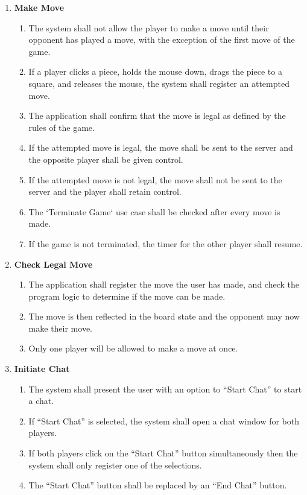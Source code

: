 \documentclass[12pt, titlepage]{article}
\begin{document}
\begin{enumerate}[{UC}1.]
        	\item \textbf{Make Move}
        	\begin{enumerate}[{FR}1., resume]
        		\item The system shall not allow the player to make a move until their opponent has played a move, with the exception of the first move of the game.
        		\item If a player clicks a piece, holds the mouse down, drags the piece to a square, and releases the mouse, the system shall register an attempted move.
        		\item The application shall confirm that the move is legal as defined by the rules of the game. 
        		\item If the attempted move is legal, the move shall be sent to the server and the opposite player shall be given control.
        		\item If the attempted move is not legal, the move shall not be sent to the server and the player shall retain control.
        		\item The `Terminate Game` use case shall be checked after every move is made.
        		\item If the game is not terminated, the timer for the other player shall resume.
        	\end{enumerate}
        	
        	\item \textbf{Check Legal Move}
        	\begin{enumerate}[{FR}1., resume]
        		\item The application shall register the move the user has made, and check the program logic to determine if the move can be made.
        		\item The move is then reflected in the board state and the opponent may now make their move.
        		\item Only one player will be allowed to make a move at once.
        	\end{enumerate}
        	
        	\item \textbf{Initiate Chat}
        	\begin{enumerate}[{FR}1., resume]
        		\item The system shall present the user with an option to ``Start Chat'' to start a chat.
        		\item If ``Start Chat'' is selected, the system shall open a chat window for both players.
        		\item If both players click on the ``Start Chat'' button simultaneously then the system shall only register one of the selections.
        		\item The ``Start Chat'' button shall be replaced by an ``End Chat'' button.
        	\end{enumerate}
        	

\end{enumerate}
\end{document}
